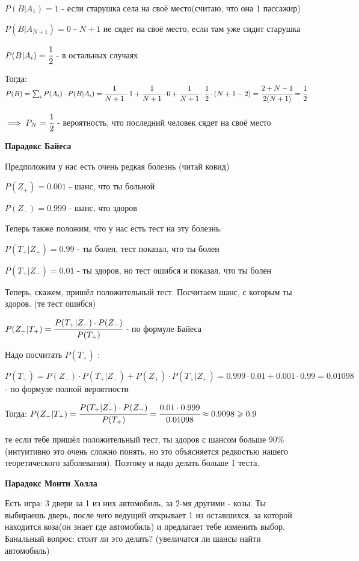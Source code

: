 \documentclass[a4paper]{article}
\begin{document}
\begin{colloq}
	$P(B | A_1) = 1$ - если старушка села на своё место(считаю, что она 1 пассажир)
	
	$P(B | A_{N+1}) = 0$ - $N+1$ не сядет на своё место, если там уже сидит старушка
	
	$P(B | A_i) = \cfrac 12$ - в остальных случаях 
	
	Тогда: $P(B) = \sum_i P(A_i) \cdot P(B | A_i) = \cfrac 1{N+1} \cdot 1 + \cfrac 1{N+1} \cdot 0 + \cfrac 1{N+1} \cdot \cfrac 12 \cdot (N+1 - 2) = \cfrac {2 + N-1}{2(N+1)} = \cfrac 12$
	
	$\implies P_N = \cfrac 12$ - вероятность, что последний человек сядет на своё место 
	
	\textbf{Парадокс Байеса}
	
	Предположим у нас есть очень редкая болезнь (читай ковид) 
	
	$P(Z_+) = 0.001$ - шанс, что ты больной
	
	$P(Z_-) = 0.999$ - шанс,  что здоров
	
	Теперь также положим, что у нас есть тест на эту болезнь:
	
	$P(T_+ | Z_+) = 0.99$ - ты болен, тест показал,  что ты болен
	
	$P(T_+ | Z_-) = 0.01$ - ты здоров, но тест ошибся и показал, что ты болен
	
	Теперь, скажем, пришёл положительный тест. Посчитаем шанс, с которым ты здоров. (те тест ошибся)
	
	$P(Z_- | T_+) = \cfrac{P(T_+ | Z_-) \cdot P(Z_-)}{P(T_+)}$ - по формуле Байеса
	
	Надо посчитать $P(T_+)$ :
	
	$P(T_+) = P(Z_-) \cdot P(T_+ | Z_-) + P(Z_+) \cdot P(T_+ | Z_+) = 0.999 \cdot 0.01 + 0.001 \cdot 0.99 = 0.01098$ - по формуле полной вероятности
	
	Тогда: $P(Z_- | T_+) = \cfrac{P(T_+ | Z_-) \cdot P(Z_-)}{P(T_+)}  = \cfrac{0.01 \cdot 0.999}{0.01098} \approx 0.9098 \geq 0.9$ 
	
	те если тебе пришёл положительный тест, ты здоров с шансом больше $90\%$(интуитивно это очень сложно понять, но это объясняется редкостью нашего теоретического заболевания). Поэтому и надо делать больше 1 теста.
	
	\textbf{Парадокс Монти Холла}
	
	Есть игра: 3 двери за 1 из них автомобиль, за 2-мя другими - козы. Ты выбираешь дверь, после чего ведущий открывает 1 из оставшихся, за которой находится коза(он знает где автомобиль) и предлагает тебе изменить выбор. Банальный вопрос: стоит ли это делать? (увеличатся ли шансы найти автомобиль)
	

\end{colloq}
\end{document}
